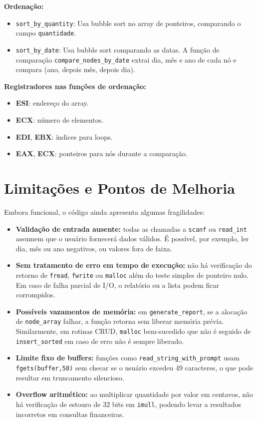 \documentclass[12pt]{article}
\begin{document}
\textbf{Ordenação:}
\begin{itemize}
    \item \texttt{sort\_by\_quantity}: Usa bubble sort no array de ponteiros, comparando o campo \texttt{quantidade}.
    \item \texttt{sort\_by\_date}: Usa bubble sort comparando as datas. A função de comparação \texttt{compare\_nodes\_by\_date} extrai dia, mês e ano de cada nó e compara (ano, depois mês, depois dia).
\end{itemize}
\textbf{Registradores nas funções de ordenação:}
\begin{itemize}
    \item \textbf{ESI}: endereço do array.
    \item \textbf{ECX}: número de elementos.
    \item \textbf{EDI}, \textbf{EBX}: índices para loops.
    \item \textbf{EAX}, \textbf{ECX}: ponteiros para nós durante a comparação.
\end{itemize}

\section{Limitações e Pontos de Melhoria}
Embora funcional, o código ainda apresenta algumas fragilidades:
\begin{itemize}
  \item \textbf{Validação de entrada ausente:} todas as chamadas a \texttt{scanf} ou \texttt{read\_int} assumem que o usuário fornecerá dados válidos. É possível, por exemplo, ler dia, mês ou ano negativos, ou valores fora de faixa.
  \item \textbf{Sem tratamento de erro em tempo de execução:} não há verificação do retorno de \texttt{fread}, \texttt{fwrite} ou \texttt{malloc} além do teste simples de ponteiro nulo. Em caso de falha parcial de I/O, o relatório ou a lista podem ficar corrompidos.
  \item \textbf{Possíveis vazamentos de memória:} em \texttt{generate\_report}, se a alocação de \texttt{node\_array} falhar, a função retorna sem liberar memória prévia. Similarmente, em rotinas CRUD, \texttt{malloc} bem-sucedido que não é seguido de \texttt{insert\_sorted} em caso de erro não é sempre liberado.
  \item \textbf{Limite fixo de buffers:} funções como \texttt{read\_string\_with\_prompt} usam \\ \texttt{fgets(buffer,50)} sem checar se o usuário excedeu 49 caracteres, o que pode resultar em truncamento silencioso.
  \item \textbf{Overflow aritmético:} ao multiplicar quantidade por valor em centavos, não há verificação de estouro de 32 bits em \texttt{imull}, podendo levar a resultados incorretos em consultas financeiras.
\end{itemize}
\end{document}
